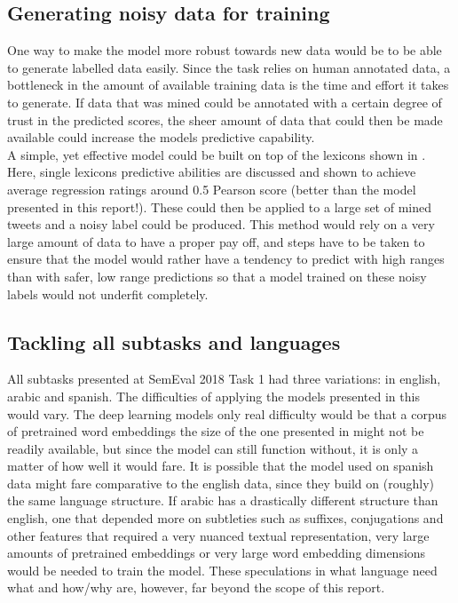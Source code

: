 \subsection{Generating noisy data for training}
One way to make the model more robust towards new data would be to be able to generate labelled data easily. Since the task relies on human annotated data, a bottleneck in the amount of available training data is the time and effort it takes to generate. If data that was mined could be annotated with a certain degree of trust in the predicted scores, the sheer amount of data that could then be made available could increase the models predictive capability.\\
A simple, yet effective model could be built on top of the lexicons shown in \cite{wassa2017}. Here, single lexicons predictive abilities are discussed and shown to achieve average regression ratings around 0.5 Pearson score (better than the model presented in this report!). These could then be applied to a large set of mined tweets and a noisy label could be produced. This method would rely on a very large amount of data to have a proper pay off, and steps have to be taken to ensure that the model would rather have a tendency to predict with high ranges than with safer, low range predictions so that a model trained on these noisy labels would not underfit completely.

\subsection{Tackling all subtasks and languages}
All subtasks presented at SemEval 2018 Task 1 had three variations: in english, arabic and spanish. The difficulties of applying the models presented in this would vary. The deep learning models only real difficulty would be that a corpus of pretrained word embeddings the size of the one presented in \cite{godin} might not be readily available, but since the model can still function without, it is only a matter of how well it would fare. It is possible that the model used on spanish data might fare comparative to the english data, since they build on (roughly) the same language structure. If arabic has a drastically different structure than english, one that depended more on subtleties such as suffixes, conjugations and other features that required a very nuanced textual representation, very large amounts of pretrained embeddings or very large word embedding dimensions would be needed to train the model. These speculations in what language need what and how/why are, however, far beyond the scope of this report.
